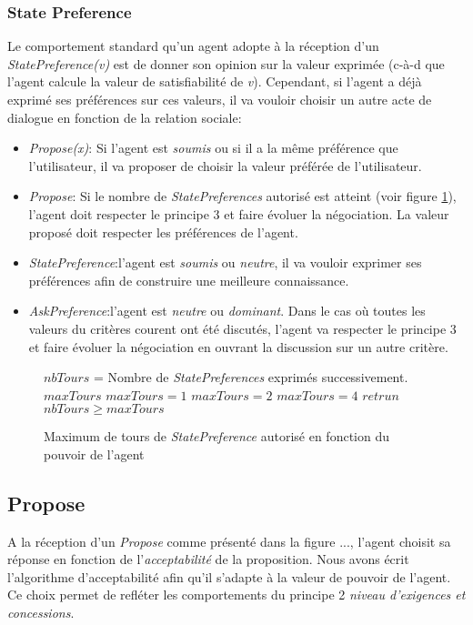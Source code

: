 		\subsubsection{State Preference}
			Le comportement standard qu'un agent adopte à la réception d'un \emph{StatePreference(v)} est de donner son opinion sur la valeur exprimée (c-à-d que l'agent calcule la valeur de satisfiabilité de \textit{v}). Cependant, si l'agent a déjà exprimé ses préférences sur ces valeurs, il va vouloir choisir un autre acte de dialogue en fonction de la relation sociale:
			\begin{itemize}
				\item \emph{Propose(x)}: Si l'agent est \emph{soumis} ou si il a la même préférence que l'utilisateur, il va proposer de choisir la valeur préférée de l'utilisateur.
				\item \emph{Propose}: Si le nombre de \emph{StatePreferences} autorisé est atteint (voir figure \ref{alg:maxtours}), l'agent doit respecter le principe 3 et faire évoluer la négociation. La valeur proposé doit respecter les préférences de l'agent. 
				\item \emph{StatePreference}:l'agent est \emph{soumis} ou \emph{neutre}, il va vouloir exprimer ses préférences afin de construire une meilleure connaissance.
				\item \emph{AskPreference}:l'agent est \emph{neutre} ou \emph{dominant}. Dans le cas où toutes les valeurs du critères courent ont été discutés, l'agent va respecter le principe 3 et faire évoluer la négociation en ouvrant la discussion sur un autre critère.
			\end{itemize}
			
			\begin{figure}[]
				\begin{algorithmic}[1]\small
					\State $nbTours$ = Nombre de \emph{StatePreferences} exprimés successivement.
					\State $maxTours$ 
					\State $maxTours = 1$
					\EndIf
					 \State $maxTours = 2$
					\EndIf
					\State $maxTours = 4$
					\EndIf
					\State $retrun$ $nbTours\geq maxTours$
					\EndFunction
				\end{algorithmic}
				\vskip 8pt
				\label{alg:maxtours}
				\caption{Maximum de tours de \emph{StatePreference} autorisé en fonction du pouvoir de l'agent}
			\end{figure} 
		\subsection{Propose}
			A la réception d'un \emph{Propose} comme présenté dans la figure ..., l'agent choisit sa réponse en fonction de l'\emph{acceptabilité} de la proposition.
			Nous avons écrit l'algorithme d'acceptabilité afin qu'il s'adapte à la valeur de pouvoir de l'agent. Ce choix permet de refléter les comportements du principe 2 \emph{niveau d'exigences et concessions}.
			
